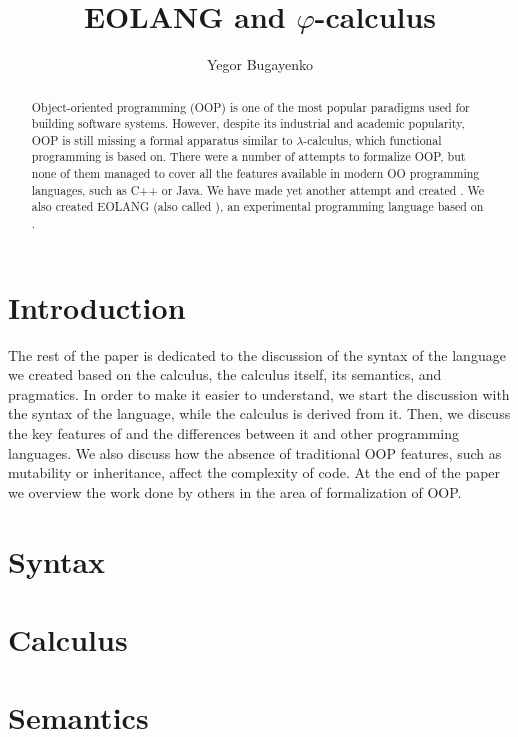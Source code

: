 \documentclass[sigplan,nonacm=true]{acmart}
\title{EOLANG and \texorpdfstring{$\varphi$}{phi}-calculus}
\subtitle{\anon{}{%
  ver: \ff{0.0.0}
  \quad
  git: \ff{00000000}
  \quad
  date: \ff{00.00.0000}
}}
\author{Yegor Bugayenko}
\affiliation{
  \institution{}
  \city{Moscow}
  \country{Russia}
}
\begin{document}
\begin{abstract}
Object-oriented programming (OOP) is one of the most popular
paradigms used for building software systems. However, despite
its industrial and academic popularity, OOP is still missing
a formal apparatus similar to $\lambda$-calculus, which functional
programming is based on. There were a number of attempts to formalize
OOP, but none of them managed to cover all the features available in
modern OO programming languages, such as C++ or Java.
We have made yet another attempt and created \phic{}. We also
created EOLANG (also called \eo{}), an experimental
programming language based on \phic{}.
\end{abstract}

\maketitle

\section{Introduction}
\label{sec:intro}



The rest of the paper is dedicated to the discussion of the
syntax of the language we created based on the calculus,
the calculus itself, its semantics, and pragmatics.
In order to make it easier to understand, we start
the discussion with the syntax of the language, while the calculus
is derived from it. Then, we discuss the
key features of \eo{} and the differences between it and other
programming languages. We also discuss how the absence of traditional
OOP features, such as mutability or inheritance, affect the complexity of code.
At the end of the paper we overview the work done by others in the area of
formalization of OOP.

\section{Syntax}
\label{sec:syntax}


\section{Calculus}
\label{sec:calculus}


\section{Semantics}
\label{sec:semantics}

\end{document}
